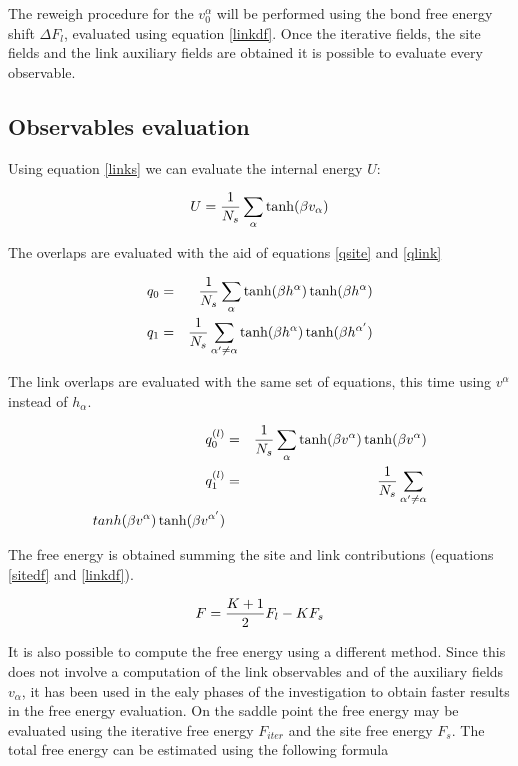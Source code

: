 The reweigh procedure for the $v_0^\alpha$ will be performed using the bond free energy shift $\Delta F_l$, evaluated using equation \ref{linkdf}.
Once the iterative fields, the site fields and the link auxiliary fields are obtained it is possible to evaluate every observable.

\subsection{Observables evaluation}

Using equation \ref{links} we can evaluate the internal energy $U$:

\begin{equation}
U= {1 \over N_s}\sum_{\alpha} \tanh (\beta v_\alpha)
\end{equation}

The overlaps are evaluated with the aid of equations \ref{qsite} and \ref{qlink}

\begin{eqnarray}
	q_0 &=& {1 \over N_s}\sum_{\alpha} \tanh(\beta h^{\alpha})\tanh(\beta h^{\alpha}) \nonumber  \\
	q_1 &=& {1 \over N_s} \sum_{\alpha'\neq\alpha} \tanh(\beta h^{\alpha})\tanh(\beta h^{\alpha'})\nonumber
\end{eqnarray}

The link overlaps are evaluated with the same set of equations, this time using $v^\alpha$ instead of $h_\alpha$.

\begin{eqnarray}
	q_0^{(l)} &=& {1 \over N_s}\sum_{\alpha} \tanh(\beta v^{\alpha})\tanh(\beta v^{\alpha})  \nonumber \\
	q_1^{(l)} &=& {1 \over N_s} \sum_{\alpha'\neq\alpha} \\tanh(\beta v^{\alpha})\tanh(\beta v^{\alpha'})\nonumber
\end{eqnarray}

The free energy is obtained summing the site and link contributions (equations \ref{sitedf} and \ref{linkdf}).

\begin{equation}
F = {K+1 \over 2} F_{l} - K F_s
\label{sitepluslink}
\end{equation}

It is also possible to compute the free energy using a different method. Since this does not involve a computation of the link observables and of the auxiliary fields $v_\alpha$, it has been used in the ealy phases of the investigation to obtain faster results in the free energy evaluation. On the saddle point the free energy may be evaluated using the iterative free energy $F_{iter}$ and the site free energy $F_s$. The total free energy can be estimated using the following formula \cite{bowman}

